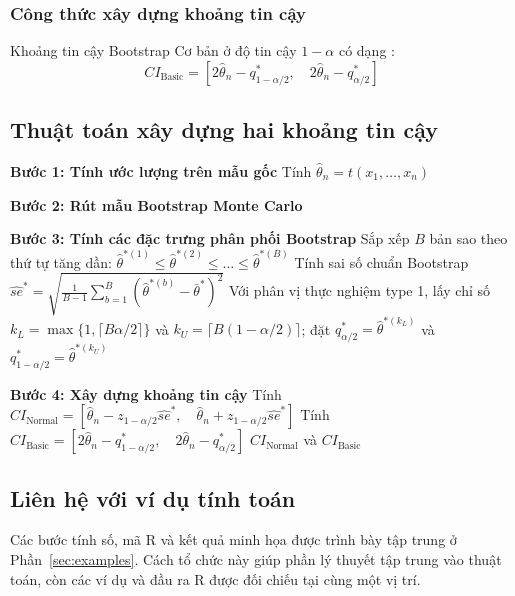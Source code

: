 	\subsubsection{Công thức xây dựng khoảng tin cậy}
	Khoảng tin cậy Bootstrap Cơ bản ở độ tin cậy $1 - \alpha$ có dạng \cite{buithuytrang2026}:
	\begin{equation}
		CI_{\text{Basic}} = \left[ 2\hat{\theta}_n - q_{1-\alpha/2}^*, \quad 2\hat{\theta}_n - q_{\alpha/2}^* \right]
	\end{equation}
	\subsection{Thuật toán xây dựng hai khoảng tin cậy}
	\begin{algorithm}[H]
		\BlankLine
		\textbf{Bước 1: Tính ước lượng trên mẫu gốc}\;
		Tính $\hat{\theta}_n = t(x_1, \dots, x_n)$ \cite{buithuytrang2026}\;
		
		\textbf{Bước 2: Rút mẫu Bootstrap Monte Carlo}\;
		
		\textbf{Bước 3: Tính các đặc trưng phân phối Bootstrap}\;
		Sắp xếp $B$ bản sao theo thứ tự tăng dần: $\hat{\theta}^{*(1)} \le \hat{\theta}^{*(2)} \le \dots \le \hat{\theta}^{*(B)}$ \cite{buithuytrang2026}\;
		Tính sai số chuẩn Bootstrap $\widehat{se}^* = \sqrt{\frac{1}{B-1}\sum_{b=1}^{B} (\hat{\theta}^{*(b)} - \bar{\theta}^*)^2}$ \cite{buithuytrang2026}\;
		Với phân vị thực nghiệm type 1, lấy chỉ số $k_L=\max\{1,\lceil B\alpha/2\rceil\}$ và $k_U=\lceil B(1-\alpha/2)\rceil$; đặt $q_{\alpha/2}^*=\hat{\theta}^{*(k_L)}$ và $q_{1-\alpha/2}^*=\hat{\theta}^{*(k_U)}$ \cite{buithuytrang2026}\;
		
		\textbf{Bước 4: Xây dựng khoảng tin cậy}\;
		Tính $CI_{\text{Normal}} = [\hat{\theta}_n - z_{1-\alpha/2}\widehat{se}^*, \quad \hat{\theta}_n + z_{1-\alpha/2}\widehat{se}^*]$ \cite{buithuytrang2026}\;
		Tính $CI_{\text{Basic}} = [2\hat{\theta}_n - q_{1-\alpha/2}^*, \quad 2\hat{\theta}_n - q_{\alpha/2}^*]$ \cite{buithuytrang2026}\;
		\Return $CI_{\text{Normal}}$ và $CI_{\text{Basic}}$ \cite{buithuytrang2026}\;
		\caption{Thuật toán 4 bước xây dựng Khoảng tin cậy Normal CI và Basic CI}
	\end{algorithm}
	
	\subsection{Liên hệ với ví dụ tính toán}

Các bước tính số, mã R và kết quả minh họa được trình bày tập trung ở
Phần~\ref{sec:examples}. Cách tổ chức này giúp phần lý thuyết tập trung vào
thuật toán, còn các ví dụ và đầu ra R được đối chiếu tại cùng một vị trí.

